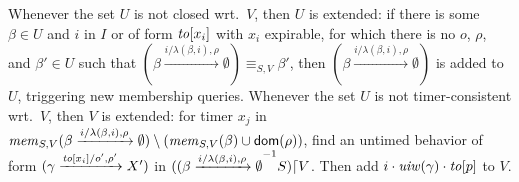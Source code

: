 Whenever the set $U$ is not closed wrt.\ $V$, then $U$ is extended:
if there is some $\beta \in U$ and $i$ in $I$ or of form $\toevent{x_i}$ with
$x_i$ expirable, for which there is no $o$, $\rho$, and $\beta' \in U$ such that
$(\beta \xrightarrow{i/\lambda(\beta,i),\rho} \emptyset) \equiv_{S,V} \beta'$, 
then $(\beta \xrightarrow{i/\lambda(\beta,i),\rho} \emptyset)$ is added to $U$,
triggering new membership queries.
Whenever the set $U$ is not timer-consistent wrt.\ $V$, then $V$ is extended:
for timer $x_j$ in
$\getmemorable{S}{\beta \xrightarrow{i/\lambda(\beta,i),\rho} \emptyset}{V} \setminus (\getmemorable{S}{\beta}{V} \cup \domof{\rho})$, find an 
untimed behavior of form $(\gamma \xrightarrow{\toevent{x_i}/o',\rho'} X')$ in
$\suffixbehs{S}{(\beta \xrightarrow{i/\lambda(\beta,i),\rho} \emptyset}{V}$.
Then add $i\cdot\untimedinputword(\gamma)\cdot\toevent{p}$ to $V$.


